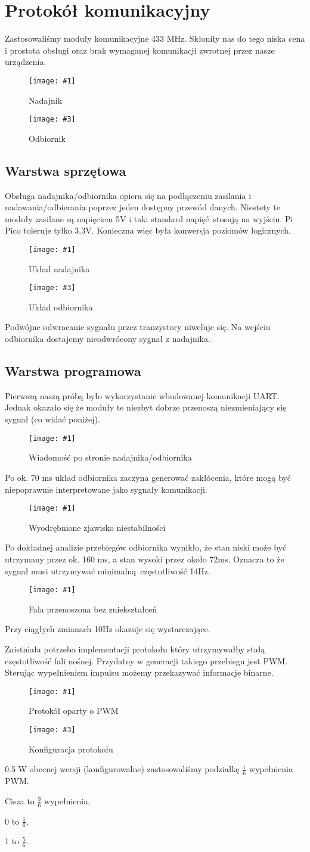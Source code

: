 \documentclass[12pt]{article}
\let\tempone\itemize
\let\temptwo\enditemize
\renewenvironment{itemize}{\tempone\setlength{\itemsep}{0cm}}{\temptwo}
\newcommand{\imgcustomsize}[3]{
	\begin{figure}[H]
		\centering
		\texttt{[image: \#1]}
		\caption{#2}
	\end{figure}
}
\newcommand{\img}[2]{\imgcustomsize{#1}{#2}{0.8}}
\newcommand{\imgsidebyside}[4]{
	\begin{figure}[H]
		\centering
		\begin{minipage}{.45\textwidth}
			\centering
			\texttt{[image: \#1]}
			\caption{#2}
		\end{minipage}%
		\hfill
		\begin{minipage}{.45\textwidth}
			\centering
			\texttt{[image: \#3]}
			\caption{#4}
		\end{minipage}
	\end{figure}
}
\begin{document}
    \pagebreak

    \section{Protokół komunikacyjny}
		Zastosowaliśmy moduły komunikacyjne 433 MHz. Skłoniły nas do tego niska cena i prostota obsługi oraz brak wymaganej komunikacji zwrotnej przez nasze urządzenia.

		\imgsidebyside{dev/tx}{Nadajnik}{dev/rx}{Odbiornik}
		\subsection{Warstwa sprzętowa}
			Obsługa nadajnika/odbiornika opiera się na podłączeniu zasilania i nadawania/odbierania poprzez jeden dostępny przewód danych. Niestety te moduły zasilane są napięciem 5V i taki standard napięć stosują na wyjściu. Pi Pico toleruje tylko 3.3V. Konieczna więc była konwersja poziomów logicznych.

			\imgsidebyside{sch/tx}{Układ nadajnika}{sch/rx}{Układ odbiornika}

			Podwójne odwracanie sygnału przez tranzystory niweluje się. Na wejściu odbiornika dostajemy nieodwrócony sygnał z nadajnika.

		\subsection{Warstwa programowa}
			Pierwszą naszą próbą było wykorzystanie wbudowanej komunikacji UART. Jednak okazało się że moduły te niezbyt dobrze przenoszą niezmieniający się sygnał (co widać poniżej).

			\img{fail1}{Wiadomość po stronie nadajnika/odbiornika}
			Po ok. 70 ms układ odbiornika zaczyna generować zakłócenia, które mogą być niepoprawnie interpretowane jako sygnały komunikacji.

			\img{fail2}{Wyodrębnione zjawisko niestabilności}
			Po dokładnej analizie przebiegów odbiornika wynikło, że stan niski może być utrzymany przez ok. 160 ms, a stan wysoki przez około 72ms. Oznacza to że sygnał musi utrzymywać minimalną częstotliwość 14Hz.

			\img{fail3_good}{Fala przenoszona bez zniekształceń}
			Przy ciągłych zmianach 10Hz okazuje się wystarczające.

			Zaistniała potrzeba implementacji protokołu który utrzymywałby stałą częstotliwość fali nośnej. Przydatny w generacji takiego przebiegu jest PWM. Sterując wypełnieniem impulsu możemy przekazywać informacje binarne.
			\imgsidebyside{pgm/proto}{Protokół oparty o PWM}{pgm/proto_conf}{Konfiguracja protokołu}{0.5}
			W obecnej wersji (konfigurowalne) zastosowaliśmy podziałkę $\frac{1}{6}$ wypełnienia PWM.
			\begin{itemize}
				\item Cisza to  $\frac{3}{6}$ wypełnienia,
				\item 0 to  $\frac{1}{6}$,
				\item 1 to  $\frac{5}{6}$.
			\end{itemize}
\end{document}

